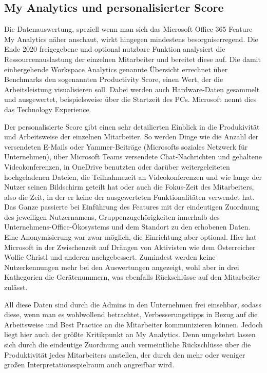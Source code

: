 \subsection{My Analytics und personalisierter Score}
Die Datenauswertung, speziell wenn man sich das Microsoft Office 365 Feature \glqq My Analytics\grqq{} näher anschaut, wirkt hingegen mindestens besorgniserregend. Die Ende 2020 freigegebene und optional nutzbare Funktion analysiert die Ressourcenauslastung der einzelnen Mitarbeiter und bereitet diese auf. Die damit einhergehende \glqq Workspace Analytics\grqq{} genannte Übersicht errechnet über Benchmarks den sogenannten \glqq Productivity Score\grqq{}, einen Wert, der die Arbeitsleistung visualisieren soll. Dabei werden auch Hardware-Daten gesammelt und ausgewertet, beispielsweise über die Startzeit des PCs. Microsoft nennt dies das \glqq Technology Experience\grqq{}.

Der personalisierte Score gibt einen sehr detailierten Einblick in die Produkivität und Arbeitsweise der einzelnen Mitarbeiter. So werden Dinge wie die Anzahl der versendeten E-Mails oder Yammer-Beiträge (Microsofts soziales Netzwerk für Unternehmen), über Microsoft Teams versendete Chat-Nachrichten und gehaltene Videokonferenzen, in OneDrive benutzten oder darüber weitergeleiteten hochgeladenen Dateien, die Teilnahmezeit an Videokonferenzen und wie lange der Nutzer seinen Bildschirm geteilt hat oder auch die \glqq Fokus-Zeit\grqq{} des Mitarbeiters, also die Zeit, in der er keine der ausgewerteten Funktionalitäten verwendet hat. Das Ganze passierte bei Einführung des Features mit der eindeutigen Zuordnung des jeweiligen Nutzernamens, Gruppenzugehörigkeiten innerhalb des Unternehmens-Office-Ökosystems und dem Standort zu den erhobenen Daten. Eine Anonymisierung war zwar möglich, die Einrichtung aber optional. Hier hat Microsoft in der Zwischenzeit auf Drängen von Aktivisten wie dem Österreicher Wolfie Christl und anderen nachgebessert. Zumindest werden keine Nutzerkennungen mehr bei den Auswertungen angezeigt, wohl aber in drei Kathegorien die Gerätenummern, was ebenfalls Rückschlüsse auf den Mitarbeiter zulässt.

All diese Daten sind durch die Admins in den Unternehmen frei einsehbar, sodass diese, wenn man es wohlwollend betrachtet, Verbesserungstipps in Bezug auf die Arbeitsweise und Best Practice an die Mitarbeiter kommunizieren können. Jedoch liegt hier auch der größte Kritikpunkt an My Analytics. Denn umgekehrt lassen sich durch die eindeutige Zuordnung auch vermeintliche Rückschlüsse über die Produktivität jedes Mitarbeiters anstellen, der durch den mehr oder weniger großen Interpretationsspielraum auch angreifbar wird.

